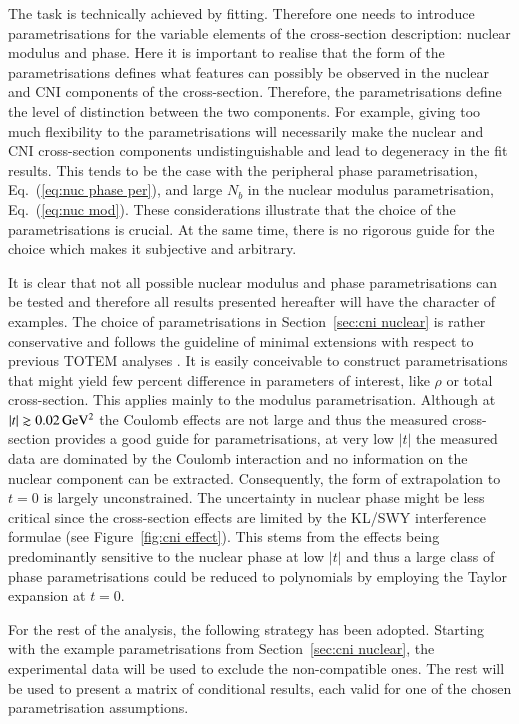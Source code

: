 The task is technically achieved by fitting. Therefore one needs to introduce parametrisations for the variable elements of the cross-section description: nuclear modulus and phase. Here it is important to realise that the form of the parametrisations defines what features can possibly be observed in the nuclear and CNI components of the cross-section. Therefore, the parametrisations define the level of distinction between the two components. For example, giving too much flexibility to the parametrisations will necessarily make the nuclear and CNI cross-section components undistinguishable and lead to degeneracy in the fit results. This tends to be the case with the peripheral phase parametrisation, Eq.~(\ref{eq:nuc phase per}), and large $N_b$ in the nuclear modulus parametrisation, Eq.~(\ref{eq:nuc mod}). These considerations illustrate that the choice of the parametrisations is crucial. At the same time, there is no rigorous guide for the choice which makes it subjective and arbitrary.

It is clear that not all possible nuclear modulus and phase parametrisations can be tested and therefore all results presented hereafter will have the character of examples. The choice of parametrisations in Section~\ref{sec:cni nuclear} is rather conservative and follows the guideline of minimal extensions with respect to previous TOTEM analyses \cite{8tev-90m}. It is easily conceivable to construct parametrisations that might yield few percent difference in parameters of interest, like $\rho$ or total cross-section. This applies mainly to the modulus parametrisation. Although at $|t| \gtrsim 0.02\,{\rm GeV^2}$ the Coulomb effects are not large and thus the measured cross-section provides a good guide for parametrisations, at very low $|t|$ the measured data are dominated by the Coulomb interaction and no information on the nuclear component can be extracted. Consequently, the form of extrapolation to $t = 0$ is largely unconstrained. The uncertainty in nuclear phase might be less critical since the cross-section effects are limited by the KL/SWY interference formulae (see Figure~\ref{fig:cni effect}). This stems from the effects being predominantly sensitive to the nuclear phase at low $|t|$ and thus a large class of phase parametrisations could be reduced to polynomials by employing the Taylor expansion at $t = 0$.

For the rest of the analysis, the following strategy has been adopted. Starting with the example parametrisations from Section~\ref{sec:cni nuclear}, the experimental data will be used to exclude the non-compatible ones. The rest will be used to present a matrix of conditional results, each valid for one of the chosen parametrisation assumptions.



